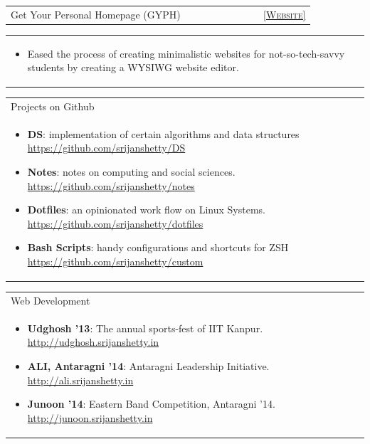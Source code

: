 \documentclass[a4paper]{article} %
\newcommand{\iproject}[3]{
    \begin{tabular}{p{0.85\linewidth}r}
        \textcolor{NavyBlue}{\small #2} & \multicolumn{1}{m{3cm}}{\raggedleft \small {\textsc{#1}}}\\
    \end{tabular}
    \begin{tabular}{p{\linewidth}}
    \vspace{-0.3cm}
        \footnotesize{#3}
    \end{tabular}
    \vspace{-0.6cm}
}
\newcommand{\projectlist}[2]{
    \begin{tabular}{p{\linewidth}}
        \textcolor{NavyBlue}{\small #1}\\
        \vspace{-0.3cm}
        \footnotesize{#2}
    \end{tabular}
    \vspace{-0.4cm}
}
\begin{document}
\iproject
    {\href{http://gyph2.herokuapp.com/} {\small [Website]}}
    {Get Your Personal Homepage (GYPH)}
    {
        \begin{itemize}[leftmargin=0.5cm]
            \item Eased the process of creating minimalistic websites for not-so-tech-savvy students by creating a
                WYSIWG website editor.
        \end{itemize}
    }

\projectlist
    {Projects on Github}
    {
     \begin{itemize}[leftmargin=0.5cm]
         \item \textbf{DS}: implementation of certain algorithms and data structures
             \href{https://github.com/srijanshetty/DS} {https://github.com/srijanshetty/DS}
         \item \textbf{Notes}: notes on computing and social sciences.
             \href{https://github.com/srijanshetty/notes} {https://github.com/srijanshetty/notes}
         \item \textbf{Dotfiles}: an opinionated work flow on Linux Systems.
             \href{https://github.com/srijanshetty/dotfiles} {https://github.com/srijanshetty/dotfiles}
         \item \textbf{Bash Scripts}: handy configurations and shortcuts for ZSH
             \href{https://github.com/srijanshetty/custom} {https://github.com/srijanshetty/custom}
     \end{itemize}
    }

\projectlist
    {Web Development}
    {
     \begin{itemize}[leftmargin=0.5cm]
         \item \textbf{Udghosh '13}: The annual sports-fest of IIT Kanpur.
             \href{http://udghosh.srijanshetty.in}{http://udghosh.srijanshetty.in}
         \item \textbf{ALI, Antaragni '14}: Antaragni Leadership Initiative.
             \href{http://ali.srijanshetty.in} {http://ali.srijanshetty.in}
         \item \textbf{Junoon '14}: Eastern Band Competition, Antaragni '14.
             \href{http://junoon.srijanshetty.in}{http://junoon.srijanshetty.in}
     \end{itemize}
    }

\end{document}
